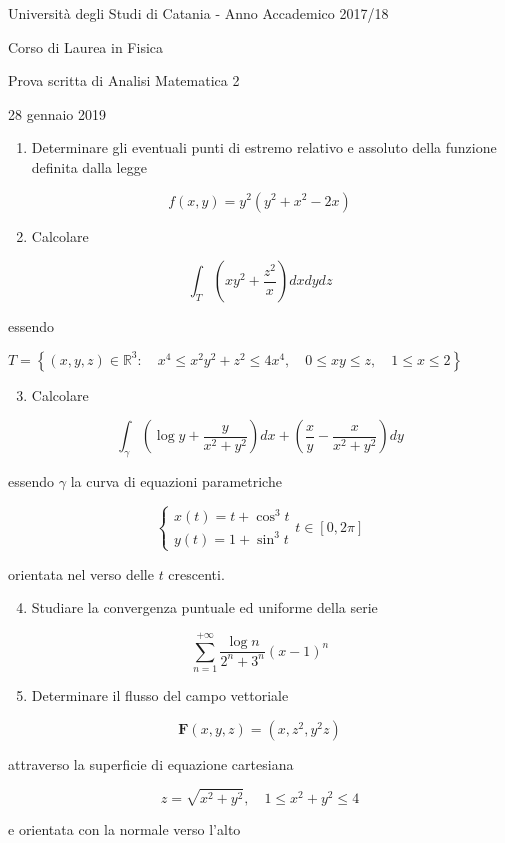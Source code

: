 \documentclass[10pt]{article}
\begin{document}
Università degli Studi di Catania - Anno Accademico 2017/18

Corso di Laurea in Fisica

Prova scritta di Analisi Matematica 2

28 gennaio 2019

\begin{enumerate}
  \item Determinare gli eventuali punti di estremo relativo e assoluto della funzione definita dalla legge
\end{enumerate}

\[
f(x, y)=y^{2}\left(y^{2}+x^{2}-2 x\right)
\]

\begin{enumerate}
  \setcounter{enumi}{1}
  \item Calcolare
\end{enumerate}

\[
\int_{T}\left(x y^{2}+\frac{z^{2}}{x}\right) d x d y d z
\]

essendo

\(T=\left\{(x, y, z) \in \mathbb{R}^{3}: \quad x^{4} \leq x^{2} y^{2}+z^{2} \leq 4 x^{4}, \quad 0 \leq x y \leq z, \quad 1 \leq x \leq 2\right\}\)

\begin{enumerate}
  \setcounter{enumi}{2}
  \item Calcolare
\end{enumerate}

\[
\int_{\gamma}\left(\log y+\frac{y}{x^{2}+y^{2}}\right) d x+\left(\frac{x}{y}-\frac{x}{x^{2}+y^{2}}\right) d y
\]

essendo \(\gamma\) la curva di equazioni parametriche

\[
\left\{\begin{array}{l}
x(t)=t+\cos ^{3} t \\
y(t)=1+\sin ^{3} t
\end{array} t \in[0,2 \pi]\right.
\]

orientata nel verso delle \(t\) crescenti.

\begin{enumerate}
  \setcounter{enumi}{3}
  \item Studiare la convergenza puntuale ed uniforme della serie
\end{enumerate}

\[
\sum_{n=1}^{+\infty} \frac{\log n}{2^{n}+3^{n}}(x-1)^{n}
\]

\begin{enumerate}
  \setcounter{enumi}{4}
  \item Determinare il flusso del campo vettoriale
\end{enumerate}

\[
\mathbf{F}(x, y, z)=\left(x, z^{2}, y^{2} z\right)
\]

attraverso la superficie di equazione cartesiana

\[
z=\sqrt{x^{2}+y^{2}}, \quad 1 \leq x^{2}+y^{2} \leq 4
\]

e orientata con la normale verso l'alto
\end{document}
